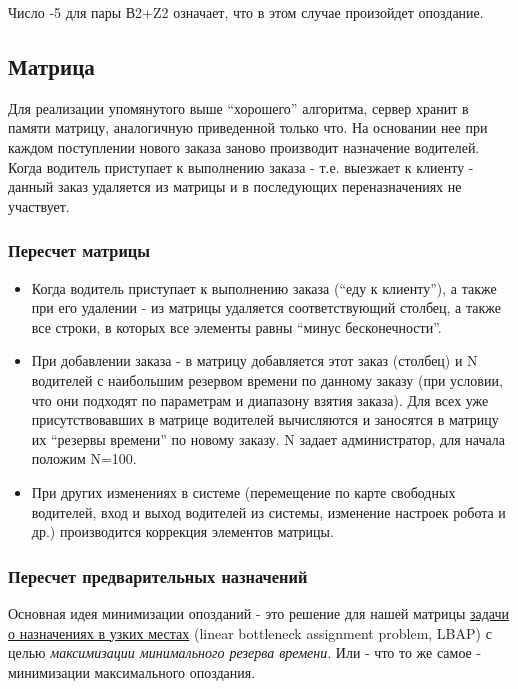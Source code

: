       	Число -5 для пары В2+Z2 означает, что в этом случае произойдет опоздание.

    \subsection{Матрица}

    	Для реализации упомянутого выше “хорошего” алгоритма, сервер хранит в памяти матрицу, аналогичную приведенной только что. На основании нее при каждом поступлении нового заказа заново производит назначение водителей. Когда водитель приступает к выполнению заказа - т.е. выезжает к клиенту - данный заказ удаляется из матрицы и в последующих переназначениях не участвует.

    	\subsubsection{Пересчет матрицы}

    		\begin{itemize}
    			\item{Когда водитель приступает к выполнению заказа (“еду к клиенту”), а также при его удалении - из матрицы удаляется соответствующий столбец, а также все строки, в которых все элементы равны “минус бесконечности”.}

    			\item{При добавлении заказа - в матрицу добавляется этот заказ (столбец) и N водителей с наибольшим резервом времени по данному заказу (при условии, что они подходят по параметрам и диапазону взятия заказа). Для всех уже присутствовавших в матрице водителей вычисляются и заносятся в матрицу их “резервы времени” по новому заказу. N задает администратор, для начала положим N=100.}

    			\item{При других изменениях в системе (перемещение по карте свободных водителей, вход и выход водителей из системы, изменение настроек робота и др.) производится коррекция элементов матрицы.}
    		\end{itemize}

    	\subsubsection{Пересчет предварительных назначений}

    		Основная идея минимизации опозданий - это решение для нашей матрицы \href{https://ru.wikipedia.org/wiki/%D0%9B%D0%B8%D0%BD%D0%B5%D0%B9%D0%BD%D0%B0%D1%8F_%D0%B7%D0%B0%D0%B4%D0%B0%D1%87%D0%B0_%D0%BE_%D0%BD%D0%B0%D0%B7%D0%BD%D0%B0%D1%87%D0%B5%D0%BD%D0%B8%D1%8F%D1%85_%D0%B2_%D1%83%D0%B7%D0%BA%D0%B8%D1%85_%D0%BC%D0%B5%D1%81%D1%82%D0%B0%D1%85}{задачи о назначениях в узких местах} (linear bottleneck assignment problem, LBAP) с целью \textit{максимизации минимального резерва времени}. Или - что то же самое - минимизации максимального опоздания.

